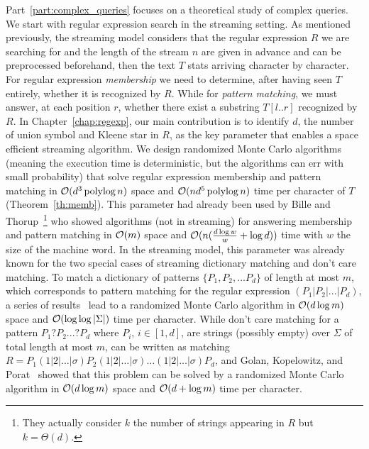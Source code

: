 Part~\ref{part:complex_queries} focuses on a theoretical study of complex queries. 
%
We start with regular expression search in the streaming setting.
%
As mentioned previously, the streaming model considers that the regular expression $R$ we are searching for and the length of the stream $n$ are given in advance and can be preprocessed beforehand, then the text $T$ stats arriving character by character. For regular expression \emph{membership} we need to determine, after having seen $T$ entirely, whether it is recognized by $R$. While for \emph{pattern matching}, we must answer, at each position $r$, whether there exist a substring $T[l..r]$ recognized by $R$.
In Chapter~\ref{chap:regexp}, our main contribution is to identify $d$, the number of union symbol and Kleene star in $R$, as the key parameter that enables a space efficient streaming algorithm. We design randomized Monte Carlo algorithms (meaning the execution time is deterministic, but the algorithms can err with small probability) that solve regular expression membership and pattern matching in $\mathcal{O}(d^3\operatorname{polylog} n)$ space and $\mathcal{O}(nd^5\operatorname{polylog} n)$ time per character of $T$ (Theorem~\ref{th:memb}).
This parameter had already been used by Bille and Thorup~\cite{doi:10.1137/1.9781611973075.104}\footnote{They actually consider $k$ the number of strings appearing in $R$ but $k=\Theta(d)$.} who showed algorithms (not in streaming) for answering membership and pattern matching in $\mathcal{O}(m)$ space and $\mathcal{O}(n(\frac{d\log w}{w} + \log d))$ time with $w$ the size of the machine word.
In the streaming model, this parameter was already known for the two special cases of streaming dictionary matching and don't care matching. To match a dictionary of patterns $\{P_1, P_2, ... P_d \}$ of length at most $m$, which corresponds to pattern matching for the regular expression $(P_1| P_2| ... | P_d)$, a series of results~\cite{Porat:09,DBLP:journals/talg/BreslauerG14,DBLP:conf/esa/CliffordFPSS15,DBLP:conf/esa/GolanP17,DBLP:conf/icalp/GolanKP18} lead to a randomized Monte Carlo algorithm in $\mathcal{O}(d\log m)$ space and $\mathcal{O}(\log \log |\Sigma|)$ time per character.
While don't care matching for a pattern $P_1 ? P_2 ... ? P_d$ where $P_i$, $i \in [1,d]$, are strings (possibly empty) over $\Sigma$ of total length at most $m$, can be written as matching $R = P_1 (1|2|\ldots|\sigma) P_2 (1|2|\ldots|\sigma) \ldots (1|2|\ldots|\sigma) P_{d}$, and Golan, Kopelowitz, and Porat~\cite{DBLP:journals/algorithmica/GolanKP19} showed that this problem can be solved by a randomized Monte Carlo algorithm in $\mathcal{O}(d \log m)$ space and $\mathcal{O}(d+\log m)$ time per character.

